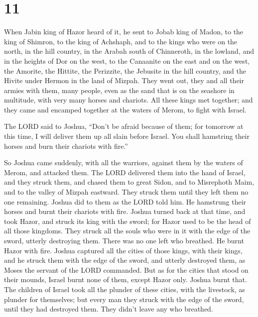 \hypertarget{section-10}{%
\section{11}\label{section-10}}

 When Jabin king of Hazor heard of it, he sent to Jobab king
of Madon, to the king of Shimron, to the king of Achshaph, 
and to the kings who were on the north, in the hill country, in the
Arabah south of Chinneroth, in the lowland, and in the heights of Dor on
the west,  to the Canaanite on the east and on the west, the
Amorite, the Hittite, the Perizzite, the Jebusite in the hill country,
and the Hivite under Hermon in the land of Mizpah.  They
went out, they and all their armies with them, many people, even as the
sand that is on the seashore in multitude, with very many horses and
chariots.  All these kings met together; and they came and
encamped together at the waters of Merom, to fight with Israel.

 The LORD said to Joshua, ``Don't be afraid because of them;
for tomorrow at this time, I will deliver them up all slain before
Israel. You shall hamstring their horses and burn their chariots with
fire.''

 So Joshua came suddenly, with all the warriors, against
them by the waters of Merom, and attacked them.  The LORD
delivered them into the hand of Israel, and they struck them, and chased
them to great Sidon, and to Misrephoth Maim, and to the valley of Mizpah
eastward. They struck them until they left them no one remaining.
 Joshua did to them as the LORD told him. He hamstrung their
horses and burnt their chariots with fire.  Joshua turned
back at that time, and took Hazor, and struck its king with the sword;
for Hazor used to be the head of all those kingdoms.  They
struck all the souls who were in it with the edge of the sword, utterly
destroying them. There was no one left who breathed. He burnt Hazor with
fire.  Joshua captured all the cities of those kings, with
their kings, and he struck them with the edge of the sword, and utterly
destroyed them, as Moses the servant of the LORD commanded.
 But as for the cities that stood on their mounds, Israel
burnt none of them, except Hazor only. Joshua burnt that. 
The children of Israel took all the plunder of these cities, with the
livestock, as plunder for themselves; but every man they struck with the
edge of the sword, until they had destroyed them. They didn't leave any
who breathed.

